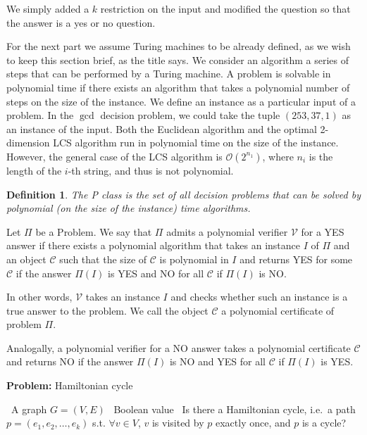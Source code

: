 \documentclass{amsart}
\theoremstyle{plain}
\newcounter{dummy-def}\numberwithin{dummy-def}{section}
\newtheorem{definition}[dummy-def]{Definition}
\newcounter{dummy-prop}\numberwithin{dummy-prop}{section}
\newcounter{dummy-corollary}\numberwithin{dummy-corollary}{section}
\newcounter{dummy-ex}\numberwithin{dummy-ex}{section}
\newcounter{dummy-eg}\numberwithin{dummy-eg}{section}
\newcommand{\bigo}{\mathcal{O}}
\newcommand{\verifier}{\mathcal{V}}
\begin{document}
We simply added a $k$ restriction on the input and modified the question so that the answer is a
yes or no question.

For the next part we assume Turing machines to be already defined, as we wish to keep this section
brief, as the title says. We consider an algorithm a series of steps that can be performed by a
Turing machine. A problem is solvable in polynomial time if there exists an algorithm that takes a
polynomial number of steps on the size of the instance. We define an instance as a particular input
of a problem. In the $\gcd$ decision problem, we could take the tuple $(253, 37, 1)$ as an instance
of the input. Both the Euclidean algorithm and the optimal 2-dimension LCS algorithm run in
polynomial time on the size of the instance. However, the general case of the LCS algorithm is
$\bigo(2^{n_1})$, where $n_i$ is the length of the $i$-th string, and thus is not polynomial.

\begin{definition} The P class is the set of all decision problems that can be solved by polynomial
  (on the size of the instance) time algorithms.
\end{definition}

Let $\Pi$ be a Problem. We say that $\Pi$ admits a polynomial verifier $\verifier$ for a YES answer
if there exists a polynomial algorithm that takes an instance $I$ of $\Pi$ and an object
$\mathcal{C}$ such that the size of $\mathcal{C}$ is polynomial in $I$ and returns YES for some
$\mathcal{C}$ if the answer $\Pi(I)$ is YES and NO for all $\mathcal{C}$ if $\Pi(I)$ is NO\@.

In other words, $\verifier$ takes an instance $I$ and checks whether such an instance is a true
answer to the problem. We call the object $\mathcal{C}$ a polynomial certificate of problem $\Pi$.

Analogally, a polynomial verifier for a NO answer takes a polynomial certificate $\mathcal{C}$ and
returns NO if the answer $\Pi(I)$ is NO and YES for all $\mathcal{C}$ if $\Pi(I)$ is YES\@.

\begin{algorithm}[h]
  \caption*{\textbf{Problem:} Hamiltonian cycle}
  \begin{algorithmic}[1]
    \Require\, A graph $G=(V, E)$
    \Ensure\, Boolean value
    \Description\, Is there a Hamiltonian cycle, i.e.\ a path $p=(e_1,e_2,\ldots,e_k)$ s.t. $\forall v
    \in V$, $v$ is visited by $p$ exactly once, and $p$ is a cycle?
  \end{algorithmic}
\end{algorithm}
\end{document}
